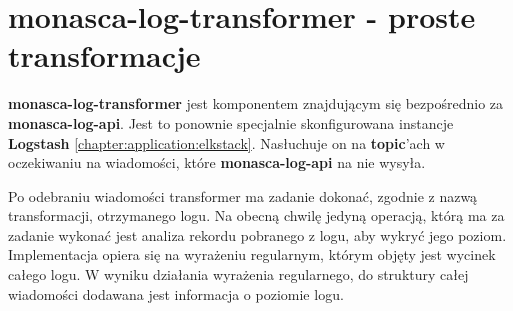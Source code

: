 \section{monasca-log-transformer - proste transformacje}

\textbf{monasca-log-transformer} jest komponentem znajdującym się bezpośrednio
za \textbf{monasca-log-api}. Jest to ponownie specjalnie skonfigurowana instancje
\textbf{Logstash} \ref{chapter:application:elkstack}. Nasłuchuje on na \textbf{topic}'ach w oczekiwaniu
na wiadomości, które \textbf{monasca-log-api} na nie wysyła. 

Po odebraniu wiadomości transformer ma zadanie dokonać, zgodnie z nazwą transformacji, otrzymanego 
logu. Na obecną chwilę jedyną operacją, którą ma za zadanie wykonać jest analiza rekordu pobranego z logu,
aby wykryć jego poziom. Implementacja opiera się na wyrażeniu regularnym, którym objęty jest wycinek
całego logu. W wyniku działania wyrażenia regularnego, do struktury całej wiadomości dodawana jest informacja
o poziomie logu. 